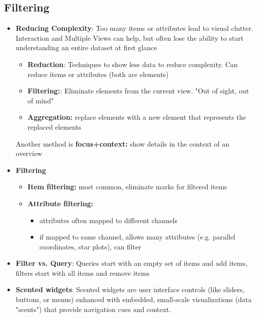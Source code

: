 \documentclass{report}
\begin{document}
    \subsection{Filtering}
    \begin{itemize}
        \item \textbf{Reducing Complexity}: Too many items or attributes lead to visual clutter. Interaction and Multiple Views can help, but often lose the ability to start understanding an entire dataset at first glance
            \bigbreak \noindent 
            \begin{itemize}
                \item \textbf{Reduction}: Techniques to show less data to reduce complexity. Can reduce items or attributes (both are elements)
                \item \textbf{Filtering:}: Eliminate elements from the current view. "Out of sight, out of mind"   
                \item \textbf{Aggregation:} replace elements with a new element that represents the replaced elements 
            \end{itemize}
            Another method is \textbf{focus+context:} show details in the context of an overview
        \item \textbf{Filtering}
            \begin{itemize}
                \item \textbf{Item filtering:} most common, eliminate marks for filtered items 
                \item \textbf{Attribute filtering:}
                    \begin{itemize}
                        \item attributes often mapped to different channels
                        \item if mapped to same channel, allows many attributes (e.g. parallel coordinates, star plots), can filter
                    \end{itemize}
            \end{itemize}
        \item \textbf{Filter vs. Query}: Queries start with an empty set of items and add items, filters start with all items and remove items
        \item \textbf{Scented widgets}: Scented widgets are user interface controls (like sliders, buttons, or menus) enhanced with embedded, small-scale visualizations (data "scents") that provide navigation cues and context.
            \bigbreak \noindent 

\end{itemize}
\end{document}
